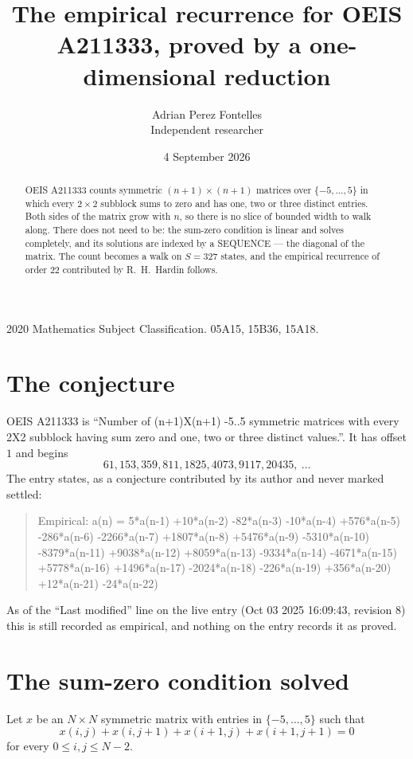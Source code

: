 \documentclass[11pt,a4paper]{article}
\title{The empirical recurrence for OEIS A211333, proved by a one-dimensional reduction}
\author{Adrian Perez Fontelles\\ \small Independent researcher}
\date{4 September 2026}
\theoremstyle{plain}
\theoremstyle{definition}
\begin{document}
\maketitle

\begin{abstract}
OEIS A211333 counts symmetric $(n+1)\times(n+1)$ matrices over
$\{-5,\dots,5\}$ in which every $2\times2$ subblock sums to zero and has one, two or three distinct
entries. Both sides of the matrix grow with $n$, so there is no slice of bounded width to walk
along. There does not need to be: the sum-zero condition is linear and solves completely, and
its solutions are indexed by a SEQUENCE --- the diagonal of the matrix. The count becomes a walk
on $S=327$ states, and the empirical recurrence of order $22$ contributed by R.~H.~Hardin
follows.
\end{abstract}

\noindent\small 2020 Mathematics Subject Classification. 05A15, 15B36, 15A18.\normalsize

\section{The conjecture}

OEIS A211333 is ``Number of (n+1)X(n+1) -5..5 symmetric matrices with every 2X2 subblock having sum zero and one, two or three distinct values.''. It has offset $1$ and begins
\[
61, 153, 359, 811, 1825, 4073, 9117, 20435,\ \dots
\]
The entry states, as a conjecture contributed by its author and never marked settled:
\begin{quote}
Empirical: a(n) = 5*a(n-1) +10*a(n-2) -82*a(n-3) -10*a(n-4) +576*a(n-5) -286*a(n-6) -2266*a(n-7) +1807*a(n-8) +5476*a(n-9) -5310*a(n-10) -8379*a(n-11) +9038*a(n-12) +8059*a(n-13) -9334*a(n-14) -4671*a(n-15) +5778*a(n-16) +1496*a(n-17) -2024*a(n-18) -226*a(n-19) +356*a(n-20) +12*a(n-21) -24*a(n-22)
\end{quote}
As of the ``Last modified'' line on the live entry (Oct 03 2025 16:09:43, revision 8) this is still
recorded as empirical, and nothing on the entry records it as proved.

\section{The sum-zero condition solved}

Let $x$ be an $N\times N$ symmetric matrix with entries in $\{-5,\dots,5\}$ such that
\[
x(i,j)+x(i,j{+}1)+x(i{+}1,j)+x(i{+}1,j{+}1)=0
\]
for every $0\le i,j\le N-2$.
\end{document}
